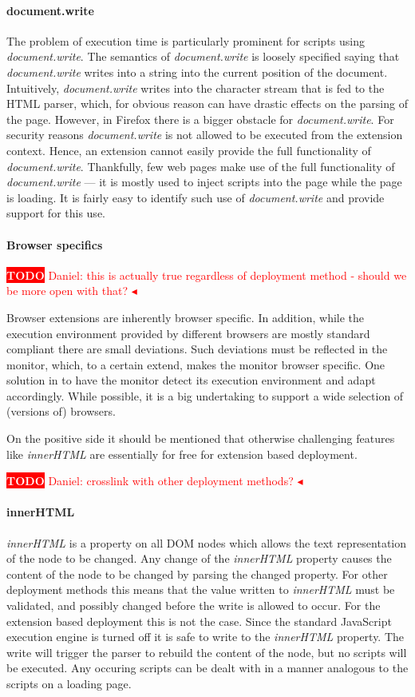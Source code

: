 \documentclass{llncs}
\newcommand{\todo}[1]{\colorbox{red}{\textcolor{white}{\sffamily\bfseries\scriptsize TODO}} \textcolor{red}{#1} \textcolor{red}{$\blacktriangleleft$}}
\begin{document}
\paragraph{document.write} The problem of execution time is particularly
prominent for scripts using \emph{document.write}. The semantics of
\emph{document.write} is loosely specified saying that \emph{document.write}
writes into a string into the current position of the document.  Intuitively,
\emph{document.write} writes into the character stream that is fed to the HTML
parser, which, for obvious reason can have drastic effects on the parsing of
the page.  However, in Firefox there is a bigger obstacle for
\emph{document.write}. For security reasons \emph{document.write} is not
allowed to be executed from the extension context.  Hence, an extension cannot
easily provide the full functionality of \emph{document.write}.  Thankfully,
few web pages make use of the full functionality of \emph{document.write} ---
it is mostly used to inject scripts into the page while the page is loading. It
is fairly easy to identify such use of \emph{document.write} and provide
support for this use.


\paragraph{Browser specifics}

\todo{Daniel: this is actually true regardless of deployment method - should we be more open with that?}

Browser extensions are inherently browser specific. In addition, while the
execution environment provided by different browsers are mostly standard
compliant there are small deviations. Such deviations must be reflected in 
the monitor, which, to a certain extend, makes the monitor browser specific.
One solution in to have the monitor detect its execution environment
and adapt accordingly. While possible, it is a big undertaking to support
a wide selection of (versions of) browsers.


On the positive side it should be mentioned that otherwise challenging features
like \emph{innerHTML} are essentially for free for extension based deployment.

\todo{Daniel: crosslink with other deployment methods?} \paragraph{innerHTML}
%
\emph{innerHTML} is a property on all DOM nodes which allows the text
representation of the node to be changed. Any change of the \emph{innerHTML}
property causes the content of the node to be changed by parsing the changed
property. For other deployment methods this means that the value written to
\emph{innerHTML} must be validated, and possibly changed before the write is
allowed to occur.  For the extension based deployment this is not the case.
Since the standard JavaScript execution engine is turned off it is safe to
write to the \emph{innerHTML} property. The write will trigger the parser to
rebuild the content of the node, but no scripts will be executed.  Any occuring
scripts can be dealt with in a manner analogous to the scripts on a loading
page.
\end{document}
